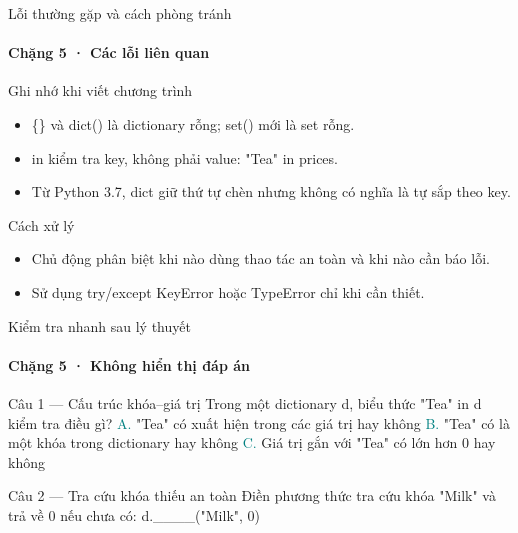 \documentclass[aspectratio=169,10pt]{beamer}
\begin{document}
\begin{frame}[t]{Lỗi thường gặp và cách phòng tránh}
\framesubtitle{Chặng 5 · Các lỗi liên quan}
\begin{alertblock}{Ghi nhớ khi viết chương trình}
\begin{itemize}
\item \{\} và dict() là dictionary rỗng; set() mới là set rỗng.
\item in kiểm tra key, không phải value: "Tea" in prices.
\item Từ Python 3.7, dict giữ thứ tự chèn nhưng không có nghĩa là tự sắp theo key.
\end{itemize}
\end{alertblock}
\begin{block}{Cách xử lý}
\begin{itemize}
\item Chủ động phân biệt khi nào dùng thao tác an toàn và khi nào cần báo lỗi.
\item Sử dụng try/except KeyError hoặc TypeError chỉ khi cần thiết.
\end{itemize}
\end{block}

\end{frame}

\begin{frame}[t]{Kiểm tra nhanh sau lý thuyết}
\framesubtitle{Chặng 5 · Không hiển thị đáp án}
\small\begin{block}{Câu 1 — Cấu trúc khóa–giá trị}
Trong một dictionary d, biểu thức "Tea" in d kiểm tra điều gì?
\medskip
\quad \textcolor{teal}{A.} "Tea" có xuất hiện trong các giá trị hay không\hspace{3mm}
\quad \textcolor{teal}{B.} "Tea" có là một khóa trong dictionary hay không\hspace{3mm}
\quad \textcolor{teal}{C.} Giá trị gắn với "Tea" có lớn hơn 0 hay không\hspace{3mm}
\end{block}
\begin{block}{Câu 2 — Tra cứu khóa thiếu an toàn}
Điền phương thức tra cứu khóa "Milk" và trả về 0 nếu chưa có: d.\_\_\_\_("Milk", 0)
\end{block}
\end{frame}
\end{document}
